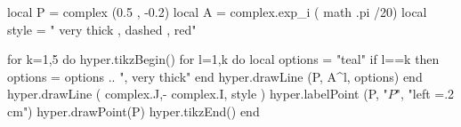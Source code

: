 \documentclass[margin=.2cm,multi,tikz]{standalone}
\begin{document}
\begin{luacode*}
local P = complex (0.5 , -0.2)
local A = complex.exp_i ( math .pi /20)
local style = " very thick , dashed , red"

for k=1,5 do 
	hyper.tikzBegin()
	for l=1,k do
		local options = "teal"
		if l==k then options = options .. ", very thick" end
		hyper.drawLine (P, A^l, options)
	end
	hyper.drawLine ( complex.J,- complex.I, style )
	hyper.labelPoint (P, "$P$", "left =.2 cm")
	hyper.drawPoint(P)
	hyper.tikzEnd()
end

\end{luacode*}
\end{document}
